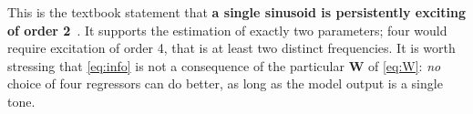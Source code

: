 \documentclass[11pt]{article}
\newcommand{\vx}{\mathbf{x}}
\newcommand{\vW}{\mathbf{W}}
\begin{document}
This is the textbook statement that \textbf{a single sinusoid is persistently exciting of order 2}~\cite{ljung1999,sastry1989}.
%
It supports the estimation of exactly two parameters; four would require excitation of order 4, that is at least two distinct frequencies.
%
%
It is worth stressing that \eqref{eq:info} is not a consequence of the
particular $\vW$ of \eqref{eq:W}: \emph{no} choice of four regressors can
do better, as long as the model output is a single tone.



\end{document}
